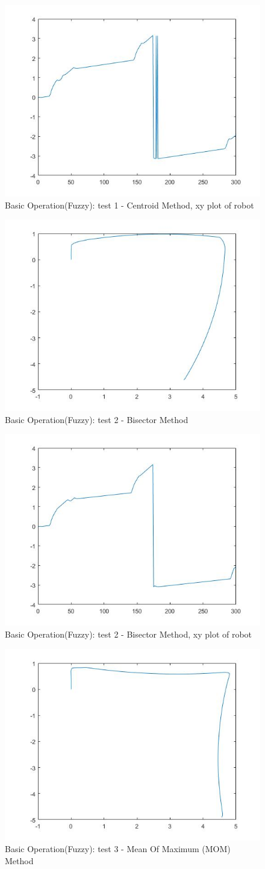 \documentclass{l4proj}
\begin{document}
\begin{figure}[htb]
    \centering
    \includegraphics[width=0.5\linewidth]{images/cefig4.jpg}

    \caption{Basic Operation(Fuzzy): test 1 - Centroid Method, xy plot of robot}
    \label{fig:Model1sim4} 
\end{figure}
\begin{figure}[htb]
    \centering
    \includegraphics[width=0.5\linewidth]{images/bifig2.jpg}

    \caption{Basic Operation(Fuzzy): test 2 - Bisector Method}
    \label{fig:Model1sim4} 
\end{figure}
\begin{figure}[htb]
    \centering
    \includegraphics[width=0.5\linewidth]{images/bifig4.jpg}

    \caption{Basic Operation(Fuzzy): test 2 - Bisector Method, xy plot of robot}
    \label{fig:Model1sim4} 
\end{figure}
\begin{figure}[htb]
    \centering
    \includegraphics[width=0.5\linewidth]{images/Mofig2.jpg}

    \caption{Basic Operation(Fuzzy): test 3 - Mean Of Maximum (MOM) Method}
    \label{fig:Model1sim4} 
\end{figure}
\end{document}
